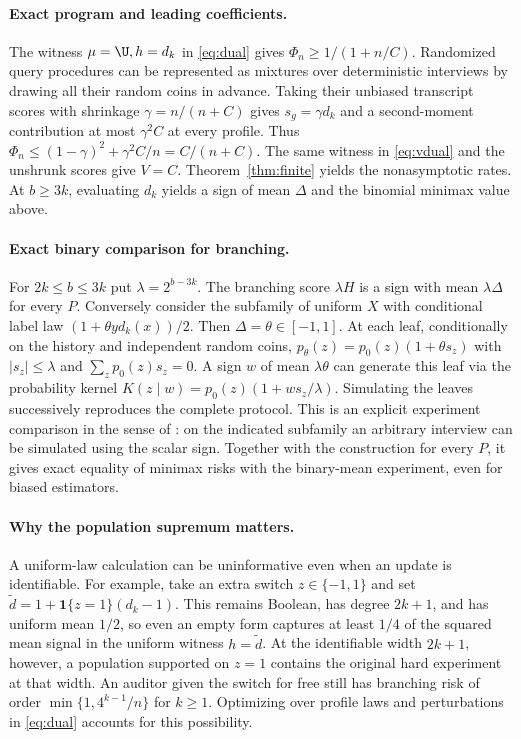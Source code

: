 \paragraph{Exact program and leading coefficients.}
The witness $\mu=\U,h=d_k$ in \eqref{eq:dual} gives $\Phi_n\ge1/(1+n/C)$. Randomized query procedures can be represented as mixtures over deterministic interviews by drawing all their random coins in advance. Taking their unbiased transcript scores with shrinkage $\gamma=n/(n+C)$ gives $s_g=\gamma d_k$ and a second-moment contribution at most $\gamma^2 C$ at every profile. Thus $\Phi_n\le(1-\gamma)^2+\gamma^2 C/n=C/(n+C)$. The same witness in \eqref{eq:vdual} and the unshrunk scores give $V=C$. Theorem~\ref{thm:finite} yields the nonasymptotic rates. At $b\ge3k$, evaluating $d_k$ yields a sign of mean $\Delta$ and the binomial minimax value above.

\paragraph{Exact binary comparison for branching.}
For $2k\le b\le3k$ put $\lambda=2^{b-3k}$. The branching score $\lambda H$ is a sign with mean $\lambda\Delta$ for every $P$. Conversely consider the subfamily of uniform $X$ with conditional label law $(1+\theta y d_k(x))/2$. Then $\Delta=\theta\in[-1,1]$. At each leaf, conditionally on the history and independent random coins, $p_\theta(z)=p_0(z)(1+\theta s_z)$ with $|s_z|\le\lambda$ and $\sum_zp_0(z)s_z=0$. A sign $w$ of mean $\lambda\theta$ can generate this leaf via the probability kernel $K(z\mid w)=p_0(z)(1+w s_z/\lambda)$. Simulating the leaves successively reproduces the complete protocol. This is an explicit experiment comparison in the sense of \citet{blackwell1953}: on the indicated subfamily an arbitrary interview can be simulated using the scalar sign. Together with the construction for every $P$, it gives exact equality of minimax risks with the binary-mean experiment, even for biased estimators.

\paragraph{Why the population supremum matters.}
A uniform-law calculation can be uninformative even when an update is identifiable. For example, take an extra switch $z\in\{-1,1\}$ and set $\widetilde d=1+\mathbf1\{z=1\}(d_k-1)$. This remains Boolean, has degree $2k+1$, and has uniform mean $1/2$, so even an empty form captures at least $1/4$ of the squared mean signal in the uniform witness $h=\widetilde d$. At the identifiable width $2k+1$, however, a population supported on $z=1$ contains the original hard experiment at that width. An auditor given the switch for free still has branching risk of order $\min\{1,4^{k-1}/n\}$ for $k\ge1$. Optimizing over profile laws and perturbations in \eqref{eq:dual} accounts for this possibility.

